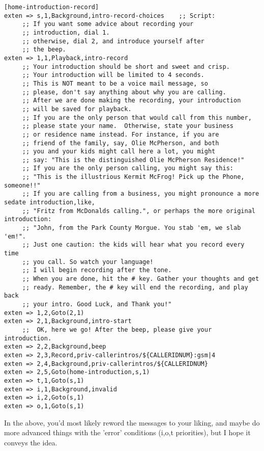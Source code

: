\begin{verbatim}
[home-introduction-record]
exten => s,1,Background,intro-record-choices    ;; Script:
     ;; If you want some advice about recording your
     ;; introduction, dial 1. 
     ;; otherwise, dial 2, and introduce yourself after
     ;; the beep.
exten => 1,1,Playback,intro-record
     ;; Your introduction should be short and sweet and crisp.
     ;; Your introduction will be limited to 4 seconds.
     ;; This is NOT meant to be a voice mail message, so
     ;; please, don't say anything about why you are calling.
     ;; After we are done making the recording, your introduction
     ;; will be saved for playback. 
     ;; If you are the only person that would call from this number, 
     ;; please state your name.  Otherwise, state your business
     ;; or residence name instead. For instance, if you are 
     ;; friend of the family, say, Olie McPherson, and both
     ;; you and your kids might call here a lot, you might
     ;; say: "This is the distinguished Olie McPherson Residence!"
     ;; If you are the only person calling, you might say this:
     ;; "This is the illustrious Kermit McFrog! Pick up the Phone, someone!!"
     ;; If you are calling from a business, you might pronounce a more sedate introduction,like,
     ;; "Fritz from McDonalds calling.", or perhaps the more original introduction:
     ;; "John, from the Park County Morgue. You stab 'em, we slab 'em!".
     ;; Just one caution: the kids will hear what you record every time
     ;; you call. So watch your language!
     ;; I will begin recording after the tone. 
     ;; When you are done, hit the # key. Gather your thoughts and get 
     ;; ready. Remember, the # key will end the recording, and play back
     ;; your intro. Good Luck, and Thank you!"
exten => 1,2,Goto(2,1)
exten => 2,1,Background,intro-start
     ;;  OK, here we go! After the beep, please give your introduction.
exten => 2,2,Background,beep
exten => 2,3,Record,priv-callerintros/${CALLERIDNUM}:gsm|4
exten => 2,4,Background,priv-callerintros/${CALLERIDNUM}
exten => 2,5,Goto(home-introduction,s,1)
exten => t,1,Goto(s,1)
exten => i,1,Background,invalid
exten => i,2,Goto(s,1)
exten => o,1,Goto(s,1)
\end{verbatim}

In the above, you'd most likely reword the messages to your liking,
and maybe do more advanced things with the 'error' conditions (i,o,t priorities),
but I hope it conveys the idea.


